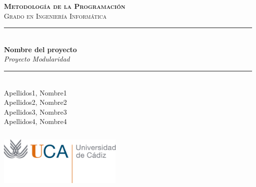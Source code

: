 

\begin{titlepage}

  \center
 
  \textsc{\Huge \bfseries Metodología de la Programación}\\[1\baselineskip]
  \textsc{\Large Grado en Ingeniería Informática}\\[2\baselineskip]
  

  \rule{\linewidth}{0.5mm} \\[0.5cm]
  {\huge \bfseries Nombre del proyecto}\\[0.4cm] 
  {\Large\textit{Proyecto Modularidad}}\\[0.5cm] 
  \rule{\linewidth}{0.5mm} \\[1.5cm]
  
  {\Large {Apellidos1, Nombre1}}\\[0.3cm]
  {\Large {Apellidos2, Nombre2}}\\[0.3cm]
  {\Large {Apellidos3, Nombre3}}\\[0.3cm]
  {\Large {Apellidos4, Nombre4}}\\[0.3cm]
  
  \vspace{0.25\textheight}
  
  \includegraphics[width=6cm,height=3cm]{uca}\\[1cm] 
 
\end{titlepage}

